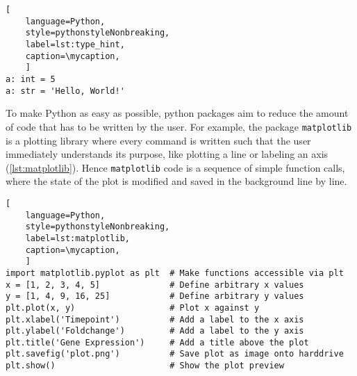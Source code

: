 \def\mycaption{ Example of type hints used in Python. Explicitly stating the
    type of the variable is optional and does not change the behavior of the
    code, but behaves exactly as shown in \autoref{lst:dynamic_typing}.}
\begin{lstlisting}[
    language=Python,
    style=pythonstyleNonbreaking,
    label=lst:type_hint,
    caption=\mycaption,
    ]
a: int = 5
a: str = 'Hello, World!'
\end{lstlisting}



To make Python as easy as possible, python packages aim to reduce the amount of
code that has to be written by the user. For example, the package
\texttt{matplotlib} is a plotting library where every command is written such
that the user immediately understands its purpose, like plotting a line or
labeling an axis (\autoref{lst:matplotlib}). Hence \texttt{matplotlib} code is a
sequence of simple function calls, where the state of the plot is modified and
saved in the background line by line.

\def\mycaption{ Example of using pre-written functions of a Python package. The
    functions of the package \texttt{matplotlib.pyplot} become accessable by
    importing the package as \texttt{plt}, where plt serves as an alias (or rather
    shortcut) to access the functions of the package. Then, two arbitrary lists are
    defined, \texttt{x} and \texttt{y}. These datapoints are plotted (scatterplot)
    using the function \texttt{plot} The plots x- and y-axes are then labeled and
    saved as an image. The code is written in a sequence of function calls, where
    the state of the plot is saved in the background. The plot is then displayed
    using the function \texttt{show}. }
\begin{lstlisting}[
    language=Python,
    style=pythonstyleNonbreaking,
    label=lst:matplotlib,
    caption=\mycaption,
    ]
import matplotlib.pyplot as plt  # Make functions accessible via plt
x = [1, 2, 3, 4, 5]              # Define arbitrary x values
y = [1, 4, 9, 16, 25]            # Define arbitrary y values
plt.plot(x, y)                   # Plot x against y
plt.xlabel('Timepoint')          # Add a label to the x axis
plt.ylabel('Foldchange')         # Add a label to the y axis
plt.title('Gene Expression')     # Add a title above the plot
plt.savefig('plot.png')          # Save plot as image onto harddrive
plt.show()                       # Show the plot preview
    
\end{lstlisting}

